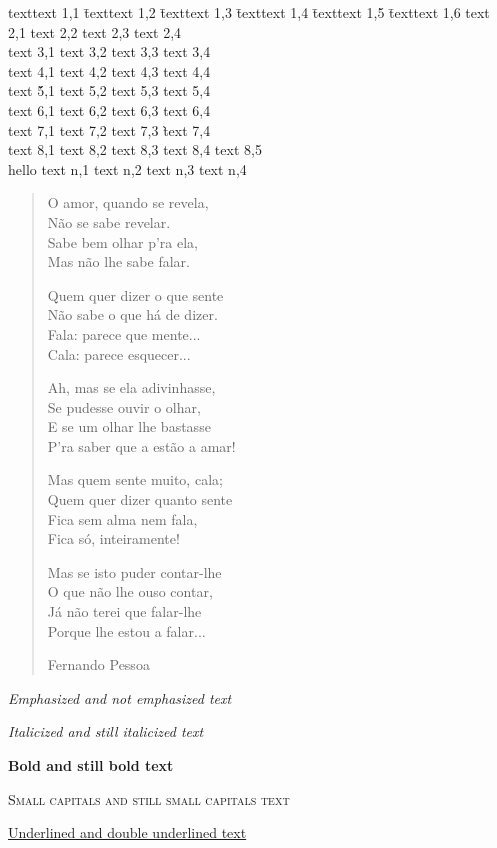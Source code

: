 \documentclass[environments-demo.tex]{subfiles}
\newcommand{\getlength}[2]{
    \newlength\abc
    #1\settowidth\abc{#2}
    \the\abc\relax
}
\begin{document}
\begin{tabbing}
texttext 1,1 \= texttext 1,2 \= texttext 1,3 \= texttext 1,4 \= texttext 1,5 \= texttext 1,6 \kill
text 2,1 \> text 2,2 \> text 2,3 \> text 2,4 \+\\
text 3,1 \> text 3,2 \> text 3,3 \> text 3,4 \-\\
text 4,1 \> text 4,2 \> text 4,3 \> text 4,4 \+\+\\
text \' 5,1 \> text 5,2 \> text 5,3 \> text 5,4 \-\\
text 6,1 \> text 6,2 \> text 6,3 \> text 6,4 \-\\
text 7,1 \> text 7,2 \> text 7,3 \` text 7,4 \\
text 8,1 \> text 8,2 \> text 8,3 \> text 8,4 \> text 8,5 \+\+\\
\< hello \> text n,1 \> text n,2 \> text n,3 \> text n,4 %
\end{tabbing}

\begin{verse}
O amor, quando se revela,\\
Não se sabe revelar.\\
Sabe bem olhar p'ra ela,\\
Mas não lhe sabe falar.

Quem quer dizer o que sente\\
Não sabe o que há de dizer.\\
Fala: parece que mente...\\
Cala: parece esquecer...

Ah, mas se ela adivinhasse,\\
Se pudesse ouvir o olhar,\\
E se um olhar lhe bastasse\\
P'ra saber que a estão a amar!

Mas quem sente muito, cala;\\
Quem quer dizer quanto sente\\
Fica sem alma nem fala,\\
Fica só, inteiramente!

Mas se isto puder contar-lhe\\
O que não lhe ouso contar,\\
Já não terei que falar-lhe\\
Porque lhe estou a falar...

Fernando Pessoa
\end{verse}

\begin{center}
\emph{Emphasized and \emph{not emphasized} text}

\textit{Italicized and \textit{still italicized} text}

\textbf{Bold and \textbf{still bold} text}

\textsc{Small capitals and \textsc{still small capitals} text}

\uline{Underlined and \uline{double underlined} text}

\end{center}

\getlength{\tiny
}{11}
\end{document}
